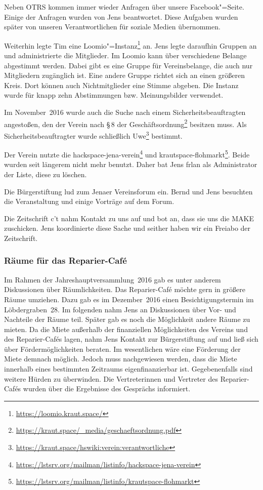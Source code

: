 \documentclass[ngerman]{scrartcl}
\begin{document}
Neben OTRS kommen immer wieder Anfragen über unsere Facebook"=Seite. Einige der
Anfragen wurden von Jens beantwortet. Diese Aufgaben wurden später von unseren
Verantwortlichen für soziale Medien übernommen.

Weiterhin legte Tim eine
Loomio"=Instanz\footnote{\url{https://loomio.kraut.space/}} an. Jens legte
daraufhin Gruppen an und administrierte die Mitglieder. Im Loomio kann über
verschiedene Belange abgestimmt werden. Dabei gibt es eine Gruppe für
Vereinsbelange, die auch nur Mitgliedern zugänglich ist. Eine andere Gruppe
richtet sich an einen größeren Kreis. Dort können auch Nichtmitglieder eine
Stimme abgeben. Die Instanz wurde für knapp zehn Abstimmungen
bzw. Meinungsbilder verwendet.

Im November~2016 wurde auch die Suche nach einem Sicherheitsbeauftragten
angestoßen, den der Verein nach §\,8 der
Geschäftsordnung\footnote{\url{https://kraut.space/_media/geschaeftsordnung.pdf}}
besitzen muss. Als Sicherheitsbeauftragter wurde schließlich
Uwe\footnote{\url{https://kraut.space/hswiki:verein:verantwortliche}} bestimmt.

Der Verein nutzte die
hackspace-jena-verein\footnote{\url{https://lstsrv.org/mailman/listinfo/hackspace-jena-verein}}
und
krautspace-flohmarkt\footnote{\url{https://lstsrv.org/mailman/listinfo/krautspace-flohmarkt}}. Beide
wurden seit längerem nicht mehr benutzt. Daher bat Jens frlan als Administrator
der Liste, diese zu löschen.

Die Bürgerstiftung lud zum Jenaer Vereinsforum ein. Bernd und Jens besuchten die
Veranstaltung und einige Vorträge auf dem Forum.

Die Zeitschrift c't nahm Kontakt zu uns auf und bot an, dass sie uns die MAKE
zuschicken. Jens koordinierte diese Sache und seither haben wir ein Freiabo der
Zeitschrift.


\subsubsection{Räume für das Reparier-Café}
\label{sec:raumrc}

Im Rahmen der Jahreshauptversammlung~2016 gab es unter anderem Diskussionen über
Räumlichkeiten. Das Reparier-Café möchte gern in größere Räume umziehen. Dazu
gab es im Dezember~2016 einen Besichtigungstermin im Löbdergraben~28. Im
folgenden nahm Jens an Diskussionen über Vor- und Nachteile der Räume
teil. Später gab es noch die Möglichkeit andere Räume zu mieten. Da die Miete
außerhalb der finanziellen Möglichkeiten des Vereins und des Reparier-Cafés
lagen, nahm Jens Kontakt zur Bürgerstiftung auf und ließ sich über
Fördermöglichkeiten beraten. Im wesentlichen wäre eine Förderung der Miete
demnach möglich. Jedoch muss nachgewiesen werden, dass die Miete innerhalb eines
bestimmten Zeitraums eigenfinanzierbar ist. Gegebenenfalls sind weitere Hürden
zu überwinden. Die Vertreterinnen und Vertreter des Reparier-Cafés wurden über
die Ergebnisse des Gesprächs informiert.
\end{document}
